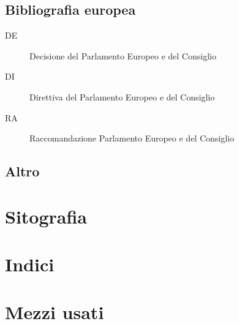 \documentclass[a4paper]{book}%
\begin{document}
 \section{Bibliografia europea}
 \begin{description}
 	\item[DE] Decisione del Parlamento Europeo e del Consiglio
 	\item[DI] Direttiva del Parlamento Europeo e del Consiglio
 	\item[RA] Raccomandazione Parlamento Europeo e del Consiglio
 \end{description}
\printbibliography[keyword=EU,heading=subbibliography]
\section{Altro}
\printbibliography[keyword=EXTRA, heading=subbibliography]
\printbibliography[keyword=BOOK,title={Pubblicazioni}]
\chapter{Sitografia}
\printbibliography[keyword=WWW,type=online,restoreclassic,annotation=false,heading=subbibliography]

\chapter{Indici}
\printindex
\printindex[due]
\backmatter
\appendix

\chapter{Mezzi usati}
\CDMezziUsati
\end{document}
